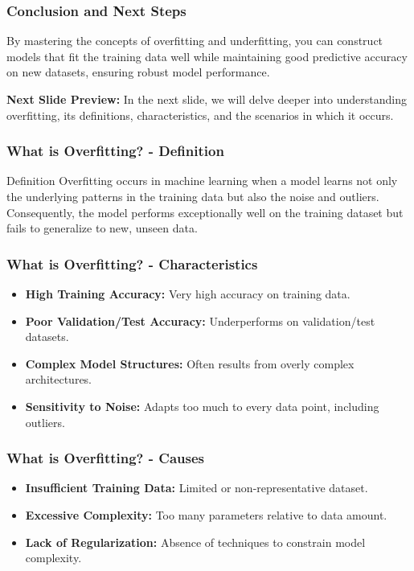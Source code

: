 \documentclass[aspectratio=169]{beamer}
\begin{document}
\begin{frame}[fragile]
    \frametitle{Conclusion and Next Steps}
    By mastering the concepts of overfitting and underfitting, you can construct models that fit the training data well while maintaining good predictive accuracy on new datasets, ensuring robust model performance.
    
    \textbf{Next Slide Preview:} In the next slide, we will delve deeper into understanding overfitting, its definitions, characteristics, and the scenarios in which it occurs.
\end{frame}

\begin{frame}[fragile]
    \frametitle{What is Overfitting? - Definition}
    \begin{block}{Definition}
        Overfitting occurs in machine learning when a model learns not only the underlying patterns in the training data but also the noise and outliers. Consequently, the model performs exceptionally well on the training dataset but fails to generalize to new, unseen data.
    \end{block}
\end{frame}

\begin{frame}[fragile]
    \frametitle{What is Overfitting? - Characteristics}
    \begin{itemize}
        \item \textbf{High Training Accuracy:} Very high accuracy on training data.
        \item \textbf{Poor Validation/Test Accuracy:} Underperforms on validation/test datasets.
        \item \textbf{Complex Model Structures:} Often results from overly complex architectures.
        \item \textbf{Sensitivity to Noise:} Adapts too much to every data point, including outliers.
    \end{itemize}
\end{frame}

\begin{frame}[fragile]
    \frametitle{What is Overfitting? - Causes}
    \begin{itemize}
        \item \textbf{Insufficient Training Data:} Limited or non-representative dataset.
        \item \textbf{Excessive Complexity:} Too many parameters relative to data amount.
        \item \textbf{Lack of Regularization:} Absence of techniques to constrain model complexity.
    \end{itemize}
\end{frame}
\end{document}

